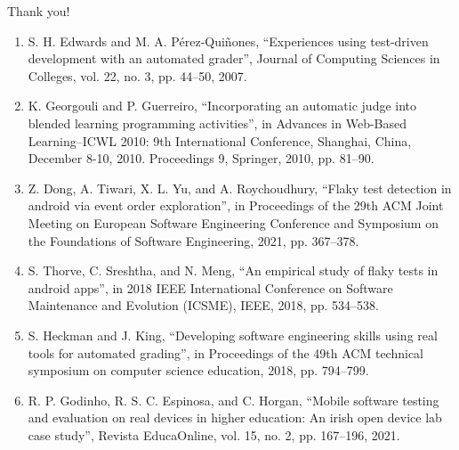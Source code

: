 \documentclass{beamer}%
\begin{document}
\begin{frame}{ }
\footnotesize

\begin{minipage}[t][0.8715\textheight]{\linewidth}
\begin{center}
Thank you! \vspace{1.5ex}
\end{center}

\scriptsize
\begin{enumerate}

\item<1->[[8\text{]}] S. H. Edwards and M. A. Pérez-Quiñones, “Experiences using test-driven development with an automated grader”, Journal of Computing Sciences in Colleges, vol. 22, no. 3, pp. 44–50, 2007.
\item<1->[[9\text{]}] K. Georgouli and P. Guerreiro, “Incorporating an automatic judge into blended learning programming activities”, in Advances in Web-Based Learning–ICWL 2010: 9th International Conference, Shanghai, China, December 8-10, 2010. Proceedings 9, Springer, 2010, pp. 81–90.
\item<1->[[10\text{]}]Z. Dong, A. Tiwari, X. L. Yu, and A. Roychoudhury, “Flaky test detection in android via event order exploration”, in Proceedings of the 29th ACM Joint Meeting on European Software Engineering Conference and Symposium on the Foundations of Software Engineering, 2021, pp. 367–378.
\item<1->[[11\text{]}] S. Thorve, C. Sreshtha, and N. Meng, “An empirical study of flaky tests in android apps”, in 2018 IEEE International Conference on Software Maintenance and Evolution (ICSME), IEEE, 2018, pp. 534–538.
\item<1->[[12\text{]}] S. Heckman and J. King, “Developing software engineering skills using real tools for automated grading”, in Proceedings of the 49th ACM technical symposium on computer science education, 2018, pp. 794–799.
\item<1->[[13\text{]}] R. P. Godinho, R. S. C. Espinosa, and C. Horgan, “Mobile software testing and evaluation on real devices in higher education: An irish open device lab case study”, Revista EducaOnline, vol. 15, no. 2, pp. 167–196, 2021.


\end{enumerate}


\vspace{3ex}%
\end{minipage}



\end{frame}
\end{document}
